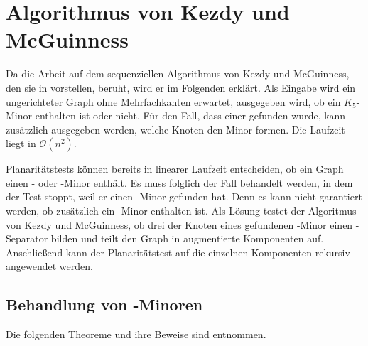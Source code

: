 \chapter{Algorithmus von Kezdy und McGuinness}
\label{cha:algorithmuskezdymcguinness}

Da die Arbeit auf dem sequenziellen Algorithmus von Kezdy und McGuinness, den sie in \cite{KeM92} vorstellen, beruht, wird er im Folgenden erklärt.
Als Eingabe wird ein ungerichteter Graph ohne Mehrfachkanten erwartet, ausgegeben wird, ob ein $K_5$-Minor enthalten ist oder nicht.
Für den Fall, dass einer gefunden wurde, kann zusätzlich ausgegeben werden, welche Knoten den Minor formen.
Die Laufzeit liegt in $\mathcal{O}(n^2)$.

Planaritätstests können bereits in linearer Laufzeit entscheiden, ob ein Graph einen \kf- oder \kdd-Minor enthält.
Es muss folglich der Fall behandelt werden, in dem der Test stoppt, weil er einen \kdd-Minor gefunden hat.
Denn es kann nicht garantiert werden, ob zusätzlich ein \kf-Minor enthalten ist.
Als Lösung testet der Algoritmus von Kezdy und McGuinness, ob drei der Knoten eines gefundenen \kdd-Minor einen \dd-Separator bilden und teilt den Graph in augmentierte Komponenten auf.
Anschließend kann der Planaritätstest auf die einzelnen Komponenten rekursiv angewendet werden.


\section{Behandlung von \kdd-Minoren}
\label{sec:behandlung_von_kdd_minoren}

Die folgenden Theoreme und ihre Beweise sind \cite{KeM92} entnommen.

